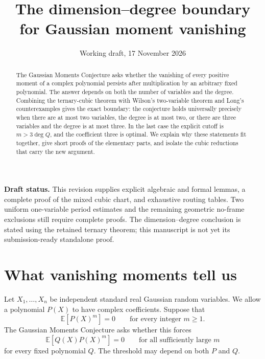 \documentclass[11pt]{article}
\title{The dimension--degree boundary\\for Gaussian moment vanishing}
\author{}
\date{Working draft, 17 November 2026}
\theoremstyle{definition}\newtheorem{definition}[theorem]{Definition}
\theoremstyle{remark}\newtheorem{remark}[theorem]{Remark}
\newcommand{\E}{\mathbb E}
\begin{document}
\maketitle
\begin{center}\begin{minipage}{0.91\textwidth}\small
\textbf{Draft status.} This revision supplies explicit algebraic and formal
lemmas, a complete proof of the mixed cubic chart, and exhaustive routing
tables. Two uniform one-variable period estimates and the remaining
geometric no-frame exclusions still require complete proofs. The
dimension--degree conclusion is stated using the retained ternary theorem;
this manuscript is not yet its submission-ready standalone proof.
\end{minipage}\end{center}

\begin{abstract}
The Gaussian Moments Conjecture asks whether the vanishing of every
positive moment of a complex polynomial persists after multiplication by
an arbitrary fixed polynomial. The answer depends on both the number of
variables and the degree. Combining the ternary-cubic theorem with
Wilson's two-variable theorem and Long's counterexamples gives the exact
boundary: the conjecture holds universally precisely when there are at
most two variables, the degree is at most two, or there are three variables
and the degree is at most three. In the last case the explicit cutoff is
$m>3\deg Q$, and the coefficient three is optimal. We explain why these
statements fit together, give short proofs of the elementary parts, and
isolate the cubic reductions that carry the new argument.
\end{abstract}

\section{What vanishing moments tell us}

Let $X_1,\ldots,X_n$ be independent standard real Gaussian random
variables. We allow a polynomial $P(X)$ to have complex coefficients.
Suppose that
\begin{equation}\label{eq:pure}
  \E[P(X)^m]=0\qquad\text{for every integer }m\geq1.
\end{equation}
The Gaussian Moments Conjecture asks whether this forces
\begin{equation}\label{eq:safe}
  \E[Q(X)P(X)^m]=0\qquad\text{for all sufficiently large }m
\end{equation}
for every fixed polynomial $Q$. The threshold may depend on both $P$
and $Q$.
\end{document}
